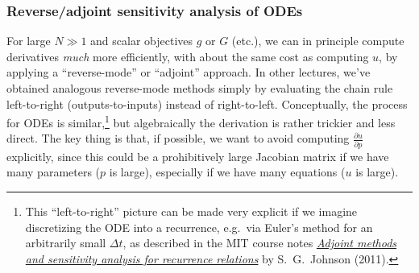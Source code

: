 \subsubsection{Reverse/adjoint sensitivity analysis of ODEs}

For large $N\gg1$ and scalar objectives $g$ or $G$ (etc.), we can
in principle compute derivatives \emph{much} more efficiently, with
about the same cost as computing $u$, by applying a ``reverse-mode''
or ``adjoint'' approach. In other lectures, we've obtained analogous
reverse-mode methods simply by evaluating the chain rule left-to-right
(outputs-to-inputs) instead of right-to-left. Conceptually, the process
for ODEs is similar,\footnote{This ``left-to-right'' picture can be made very explicit if we imagine
discretizing the ODE into a recurrence, e.g.~via Euler's method for
an arbitrarily small $\Delta t$, as described in the MIT course notes
\emph{\href{https://math.mit.edu/~stevenj/18.336/recurrence2.pdf}{Adjoint methods and sensitivity analysis for recurrence relations}}
by S.~G.~Johnson (2011).} but algebraically the derivation is rather trickier and less direct.
The key thing is that, if possible, we want to avoid computing $\frac{\partial u}{\partial p}$
explicitly, since this could be a prohibitively large Jacobian matrix
if we have many parameters ($p$ is large), especially if we have
many equations ($u$ is large). 

